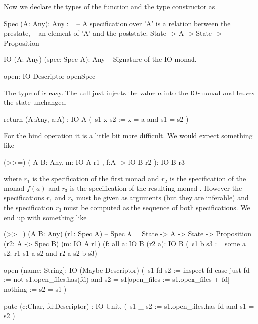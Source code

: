 Now we declare the types of the function  and the type constructor
 as
%
\begin{alba}
    Spec (A: Any): Any :=
            -- A specification over 'A' is a relation between the prestate,
            -- an element of 'A' and the poststate.
        State -> A -> State -> Proposition

    IO (A: Any) (spec: Spec A): Any
        -- Signature of the IO monad.

    open: IO Descriptor openSpec
\end{alba}
%
The type of  is easy. The call  just injects the
value $a$ into the IO-monad and leaves the state unchanged.
%
\begin{alba}
  return (A:Any, a:A)
         : IO  A
               (\ s1 x s2 :=
                   x  = a and
                   s1 = s2 )
\end{alba}
%
For the bind operation it is a little bit more difficult. We would expect
something like
%
\begin{alba}
  (>>=) ( A B: Any,
          m: IO A r1 ,
          f:A -> IO B r2
        ): IO B r3
\end{alba}
%
where $r_1$ is the specification of the first monad and $r_2$ is the
specification of the monad $f(a)$ and $r_3$ is the specification of the
resulting monad . However the specifications $r_1$ and $r_2$
must be given as arguments (but they are inferable) and the specification
$r_3$ must be computed as the sequence of both specifications. We end up with
something like

%
\begin{alba}
    (>>=)
        (A B: Any)
        (r1: Spec A)            -- Spec A = State -> A -> State -> Proposition
        (r2: A -> Spec B)
        (m: IO A r1)
        (f: all a: IO B (r2 a):
        IO  B
            (\ s1 b s3 :=
                some a s2: r1 s1 a s2 and r2 a s2 b s3)
\end{alba}
%


\begin{alba}
  open (name: String):
       IO (Maybe  Descriptor)
          (\ s1  fd  s2 :=
               inspect fd case
                  just fd :=
                     not s1.open_files.has(fd)
                     and
                     s2 = s1[open_files := s1.open_files + fd]
                  nothing :=
                     s2 = s1 )

  putc (c:Char, fd:Descriptor)
       : IO  Unit,
             (\ s1 _ s2 :=
                  s1.open_files.has fd  and
                  s1 = s2 )
\end{alba}



